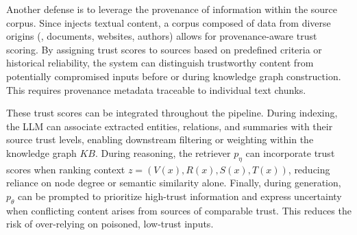 Another defense is to leverage the provenance of information within the source corpus. Since \prag injects textual content, a corpus composed of data from diverse origins (\meg, documents, websites, authors) allows for provenance-aware trust scoring. By assigning trust scores to sources based on predefined criteria or historical reliability, the system can distinguish trustworthy content from potentially compromised inputs before or during knowledge graph construction. This requires provenance metadata traceable to individual text chunks.

These trust scores can be integrated throughout the \rag pipeline. During indexing, the LLM can associate extracted entities, relations, and summaries with their source trust levels, enabling downstream filtering or weighting within the knowledge graph $KB$. During reasoning, the retriever $p_\eta$ can incorporate trust scores when ranking context $z = (V(x), R(x), S(x), T(x))$, reducing reliance on node degree or semantic similarity alone. Finally, during generation, $p_\theta$ can be prompted to prioritize high-trust information and express uncertainty when conflicting content arises from sources of comparable trust. This reduces the risk of over-relying on poisoned, low-trust inputs.










